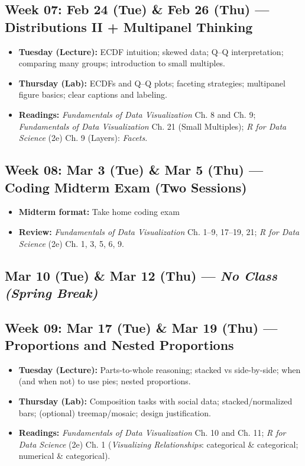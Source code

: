 \documentclass[letterpaper,11pt]{article}
\newcommand{\FDV}{\emph{Fundamentals of Data Visualization}}
\newcommand{\RDS}{\emph{R for Data Science} (2e)}
\newcommand{\compresslist}{
\setlength{\itemsep}{1pt}
\setlength{\parskip}{0pt}
\setlength{\parsep}{0pt}
}
\begin{document}
\subsection*{Week 07: Feb 24 (Tue) \& Feb 26 (Thu) --- Distributions II + Multipanel Thinking}
\begin{itemize}\compresslist
\item \textbf{Tuesday (Lecture):} ECDF intuition; skewed data; Q--Q interpretation; comparing many groups; introduction to small multiples.
\item \textbf{Thursday (Lab):} ECDFs and Q--Q plots; faceting strategies; multipanel figure basics; clear captions and labeling.
\item \textbf{Readings:} \FDV{} Ch. 8 and Ch. 9; \FDV{} Ch. 21 (Small Multiples); \RDS{} Ch. 9 (Layers): \emph{Facets}.
\end{itemize}

\subsection*{Week 08: Mar 3 (Tue) \& Mar 5 (Thu) --- \textbf{Coding Midterm Exam (Two Sessions)}}
\begin{itemize}\compresslist
\item \textbf{Midterm format:} Take home coding exam
\item \textbf{Review:} \FDV{} Ch. 1--9, 17--19, 21; \RDS{} Ch. 1, 3, 5, 6, 9.
\end{itemize}

\subsection*{Mar 10 (Tue) \& Mar 12 (Thu) --- \textit{No Class (Spring Break)}} 

\subsection*{Week 09: Mar 17 (Tue) \& Mar 19 (Thu) --- Proportions and Nested Proportions}
\begin{itemize}\compresslist
\item \textbf{Tuesday (Lecture):} Parts-to-whole reasoning; stacked vs side-by-side; when (and when not) to use pies; nested proportions.
\item \textbf{Thursday (Lab):} Composition tasks with social data; stacked/normalized bars; (optional) treemap/mosaic; design justification.
\item \textbf{Readings:} \FDV{} Ch. 10 and Ch. 11; \RDS{} Ch. 1 (\emph{Visualizing Relationships}: categorical \& categorical; numerical \& categorical).
\end{itemize}
\end{document}
